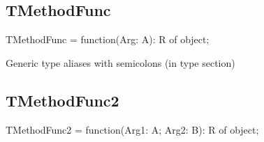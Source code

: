 \documentclass{report}
\newif\ifpdf
\begin{document}
\subsection*{TMethodFunc}
\fi
\label{ok_generic_multiple_constraints-TMethodFunc}
\begin{list}{}{
\setlength{\itemindent}{0cm}
\setlength{\listparindent}{0cm}
\setlength{\leftmargin}{\evensidemargin}
\addtolength{\leftmargin}{\tmplength}
\settowidth{\labelsep}{X}
\addtolength{\leftmargin}{\labelsep}
\setlength{\labelwidth}{\tmplength}
}
\item[\textbf{Declaration}\hfill]
\ifpdf
\begin{flushleft}
\fi
\begin{ttfamily}
TMethodFunc = function(Arg: A): R of object;\end{ttfamily}

\ifpdf
\end{flushleft}
\fi

\par
\item[\textbf{Description}]
Generic type aliases with semicolons (in type section)

\end{list}
\ifpdf
\subsection*{\large{\textbf{TMethodFunc2}}\normalsize\hspace{1ex}\hrulefill}
\else
\subsection*{TMethodFunc2}
\fi
\label{ok_generic_multiple_constraints-TMethodFunc2}
\begin{list}{}{
\setlength{\itemindent}{0cm}
\setlength{\listparindent}{0cm}
\setlength{\leftmargin}{\evensidemargin}
\addtolength{\leftmargin}{\tmplength}
\settowidth{\labelsep}{X}
\addtolength{\leftmargin}{\labelsep}
\setlength{\labelwidth}{\tmplength}
}
\item[\textbf{Declaration}\hfill]
\ifpdf
\begin{flushleft}
\fi
\begin{ttfamily}
TMethodFunc2 = function(Arg1: A; Arg2: B): R of object;\end{ttfamily}

\ifpdf
\end{flushleft}
\fi

\end{list}
\end{document}
